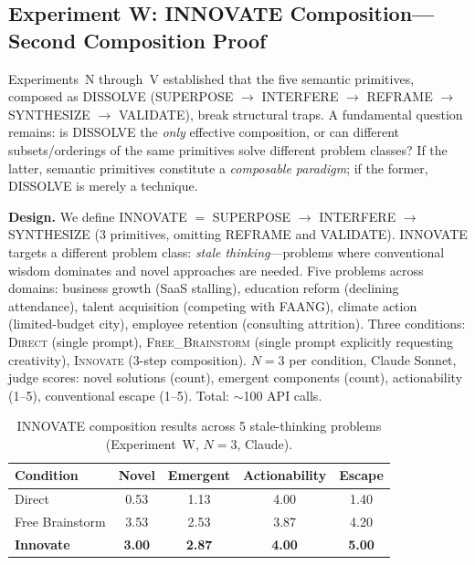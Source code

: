 \documentclass[11pt,a4paper]{article}
\begin{document}
\subsection{Experiment W: INNOVATE Composition---Second Composition Proof}
\label{sec:innovate}

Experiments~N through~V established that the five semantic primitives, composed as DISSOLVE (SUPERPOSE $\to$ INTERFERE $\to$ REFRAME $\to$ SYNTHESIZE $\to$ VALIDATE), break structural traps. A fundamental question remains: is DISSOLVE the \emph{only} effective composition, or can different subsets/orderings of the same primitives solve different problem classes? If the latter, semantic primitives constitute a \emph{composable paradigm}; if the former, DISSOLVE is merely a technique.

\textbf{Design.} We define INNOVATE $=$ SUPERPOSE $\to$ INTERFERE $\to$ SYNTHESIZE (3 primitives, omitting REFRAME and VALIDATE). INNOVATE targets a different problem class: \emph{stale thinking}---problems where conventional wisdom dominates and novel approaches are needed. Five problems across domains: business growth (SaaS stalling), education reform (declining attendance), talent acquisition (competing with FAANG), climate action (limited-budget city), employee retention (consulting attrition). Three conditions: \textsc{Direct} (single prompt), \textsc{Free\_Brainstorm} (single prompt explicitly requesting creativity), \textsc{Innovate} (3-step composition). $N=3$ per condition, Claude Sonnet, judge scores: novel solutions (count), emergent components (count), actionability (1--5), conventional escape (1--5). Total: $\sim$100 API calls.

\begin{table}[H]
\centering
\caption{INNOVATE composition results across 5 stale-thinking problems (Experiment~W, $N=3$, Claude).}
\small
\begin{tabular}{lcccc}
\toprule
\textbf{Condition} & \textbf{Novel} & \textbf{Emergent} & \textbf{Actionability} & \textbf{Escape} \\
\midrule
Direct              & 0.53 & 1.13 & 4.00 & 1.40 \\
Free Brainstorm     & 3.53 & 2.53 & 3.87 & 4.20 \\
\textbf{Innovate}   & \textbf{3.00} & \textbf{2.87} & \textbf{4.00} & \textbf{5.00} \\
\bottomrule
\end{tabular}
\label{tab:innovate}
\end{table}
\end{document}
